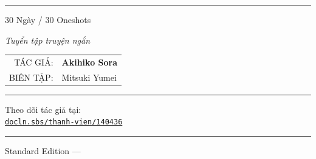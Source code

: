 \begin{center}
    \textcolor{bunko_gray}{\rule{4cm}{0.5pt}}
    
    \vspace{1cm}
    
    {\titlefont\Large 30 Ngày / 30 Oneshots}
    
    \vspace{0.3cm}
    
    {\textit{Tuyển tập truyện ngắn}}
    
    \vspace{1cm}
    
    \dividerline
    
    \vspace{1cm}
    
    \begin{tabular}{rl}
        \textcolor{bunko_gray}{\footnotesize TÁC GIẢ:} & \textbf{Akihiko Sora} \\[0.4cm]
        \textcolor{bunko_gray}{\footnotesize BIÊN TẬP:} & Mitsuki Yumei \\
    \end{tabular}
    
    \vspace{1.5cm}
    
    \textcolor{bunko_gray}{\rule{3cm}{0.3pt}}
    
    \vspace{1cm}
    
    {\footnotesize\textcolor{bunko_gray}{
        Theo dõi tác giả tại:\\[0.3cm]
        \href{https://docln.sbs/thanh-vien/140436}{\texttt{docln.sbs/thanh-vien/140436}}
    }}
    
    \vspace{1.5cm}
    
    \textcolor{bunko_gray}{\rule{4cm}{0.5pt}}
    
    \vspace{0.5cm}
    
    {\footnotesize\textcolor{bunko_gray}{Standard Edition — \the\year}}
\end{center}

\vspace*{\fill}